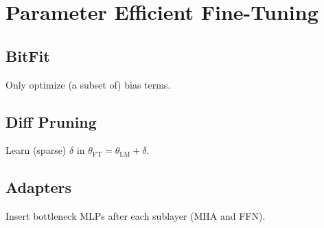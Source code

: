 \section{Parameter Efficient Fine-Tuning}
\subsection*{BitFit}
Only optimize (a subset of) bias terms.

\subsection*{Diff Pruning}
Learn (sparse) $\delta$ in $\theta_{\text{FT}}=\theta_{\text{LM}}+\delta$.

\subsection*{Adapters}
Insert bottleneck MLPs after each sublayer (MHA and FFN).
